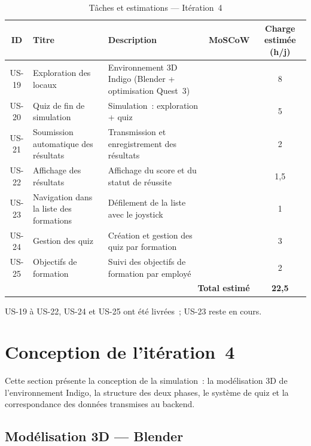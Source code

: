 \begin{table}[H]
  \centering
  \small
  \setlength{\tabcolsep}{5pt}
  \begin{tabularx}{\textwidth}{cp{3.5cm}Xc>{\footnotesize}c}
    \toprule
    \textbf{ID} & \textbf{Titre} & \textbf{Description} & \textbf{MoSCoW} & \textbf{Charge estimée (h/j)} \\
    \midrule
    US-19 & Exploration des locaux &
      Environnement 3D Indigo (Blender + optimisation Quest~3) & \must{} & 8 \\
    US-20 & Quiz de fin de simulation &
      Simulation~: exploration + quiz & \must{} & 5 \\
    US-21 & Soumission automatique des résultats &
      Transmission et enregistrement des résultats & \must{} & 2 \\
    US-22 & Affichage des résultats &
      Affichage du score et du statut de réussite & \must{} & 1,5 \\
    US-23 & Navigation dans la liste des formations &
      Défilement de la liste avec le joystick & \could{} & 1 \\
    US-24 & Gestion des quiz &
      Création et gestion des quiz par formation & \must{} & 3 \\
    US-25 & Objectifs de formation &
      Suivi des objectifs de formation par employé & \should{} & 2 \\
    \midrule
    \multicolumn{4}{r}{\textbf{Total estimé}} & \textbf{22,5} \\
    \bottomrule
  \end{tabularx}
  \caption{Tâches et estimations --- Itération~4}
  \label{tab:backlog_s4}
\end{table}

\noindent US-19 à US-22, US-24 et US-25 ont été livrées~; US-23 reste en cours.

\section{Conception de l'itération~4}

Cette section présente la conception de la simulation~: la modélisation 3D de
l'environnement Indigo, la structure des deux phases, le système de quiz et la
correspondance des données transmises au backend.

\subsection{Modélisation 3D --- Blender}

